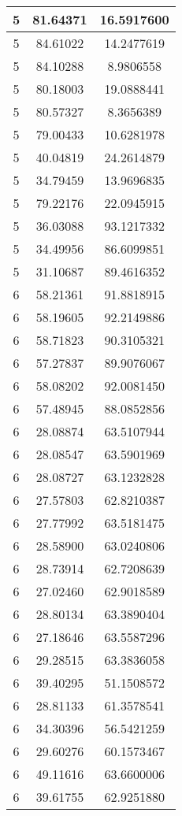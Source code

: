 \documentclass[
]{book}
\begin{document}
\begin{tabular}{c|c|c}
\hline
5 & 81.64371 & 16.5917600\\
\hline
5 & 84.61022 & 14.2477619\\
\hline
5 & 84.10288 & 8.9806558\\
\hline
5 & 80.18003 & 19.0888441\\
\hline
5 & 80.57327 & 8.3656389\\
\hline
5 & 79.00433 & 10.6281978\\
\hline
5 & 40.04819 & 24.2614879\\
\hline
5 & 34.79459 & 13.9696835\\
\hline
5 & 79.22176 & 22.0945915\\
\hline
5 & 36.03088 & 93.1217332\\
\hline
5 & 34.49956 & 86.6099851\\
\hline
5 & 31.10687 & 89.4616352\\
\hline
6 & 58.21361 & 91.8818915\\
\hline
6 & 58.19605 & 92.2149886\\
\hline
6 & 58.71823 & 90.3105321\\
\hline
6 & 57.27837 & 89.9076067\\
\hline
6 & 58.08202 & 92.0081450\\
\hline
6 & 57.48945 & 88.0852856\\
\hline
6 & 28.08874 & 63.5107944\\
\hline
6 & 28.08547 & 63.5901969\\
\hline
6 & 28.08727 & 63.1232828\\
\hline
6 & 27.57803 & 62.8210387\\
\hline
6 & 27.77992 & 63.5181475\\
\hline
6 & 28.58900 & 63.0240806\\
\hline
6 & 28.73914 & 62.7208639\\
\hline
6 & 27.02460 & 62.9018589\\
\hline
6 & 28.80134 & 63.3890404\\
\hline
6 & 27.18646 & 63.5587296\\
\hline
6 & 29.28515 & 63.3836058\\
\hline
6 & 39.40295 & 51.1508572\\
\hline
6 & 28.81133 & 61.3578541\\
\hline
6 & 34.30396 & 56.5421259\\
\hline
6 & 29.60276 & 60.1573467\\
\hline
6 & 49.11616 & 63.6600006\\
\hline
6 & 39.61755 & 62.9251880\\

\end{tabular}
\end{document}
